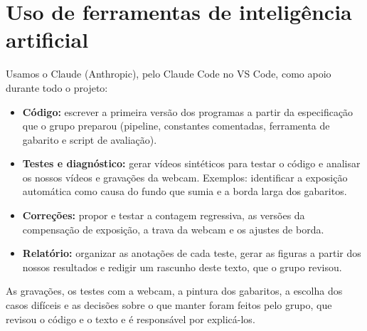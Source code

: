 \section{Uso de ferramentas de inteligência artificial}
\label{sec:ia}

Usamos o Claude (Anthropic), pelo Claude Code no VS Code, como apoio
durante todo o projeto:

\begin{itemize}[nosep]
  \item \textbf{Código:} escrever a primeira versão dos programas a
  partir da especificação que o grupo preparou (pipeline, constantes
  comentadas, ferramenta de gabarito e script de avaliação).
  \item \textbf{Testes e diagnóstico:} gerar vídeos sintéticos para
  testar o código e analisar os nossos vídeos e gravações da webcam.
  Exemplos: identificar a exposição automática como causa do fundo que
  sumia e a borda larga dos gabaritos.
  \item \textbf{Correções:} propor e testar a contagem regressiva, as
  versões da compensação de exposição, a trava da webcam e os ajustes
  de borda.
  \item \textbf{Relatório:} organizar as anotações de cada teste, gerar
  as figuras a partir dos nossos resultados e redigir um rascunho deste
  texto, que o grupo revisou.
\end{itemize}

As gravações, os testes com a webcam, a pintura dos gabaritos, a escolha
dos casos difíceis e as decisões sobre o que manter foram feitos pelo
grupo, que revisou o código e o texto e é responsável por explicá-los.
